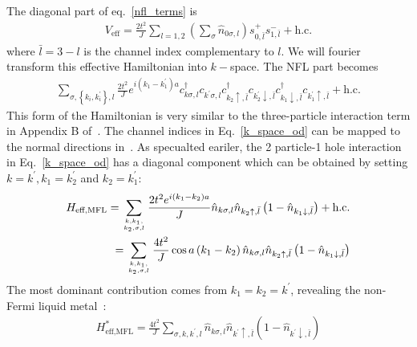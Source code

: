 \documentclass[reprint,prb,superscriptaddress]{revtex4-2}
\begin{document}
The diagonal part of eq.~\ref{nfl_terms} is
\begin{equation}\begin{aligned}
	V_\text{eff} = \frac{2t^2}{J}\sum_{l=1,2}\left(\sum_\sigma \hat n_{0\sigma,l}\right) s^+_{0,\bar l}s^-_{1,\bar l} + \text{h.c.}
\end{aligned}\end{equation}
where \(\bar l = 3 - l\) is the channel index complementary to \(l\). We will fourier transform this effective Hamiltonian into \(k-\)space. The NFL part becomes
\begin{equation}\begin{aligned}
	\label{k_space_od}
	\sum_{\sigma, \left\{k_i,k_i^\prime\right\},l} \frac{2t^2}{J}e^{i\left(k_1 - k_1^\prime\right)a}c^\dagger_{k\sigma,l}c_{k^\prime\sigma,l}c^\dagger_{k_2 \uparrow, \bar l}c_{k_2^\prime \downarrow,\bar l}c^\dagger_{k_1 \downarrow,\bar l}c_{k_1^\prime \uparrow, \bar l} + \text{h.c.} 
\end{aligned}\end{equation}
This form of the Hamiltonian is very similar to the three-particle interaction term in Appendix B of~\cite{anirbanmott1}. The channel indices in Eq.~\ref{k_space_od} can be mapped to the normal directions in~\cite{anirbanmott1}. As specualted eariler, the 2 particle-1 hole interaction in Eq.~\ref{k_space_od} has a diagonal component which can be obtained by setting \(k=k^\prime, k_1 = k_2^\prime\) and \(k_2 = k_1^\prime\):
\begin{equation}\begin{aligned}
	H_\text{eff,MFL} = \sum_{k, k_1, \atop{k_2,\sigma,  l}} \frac{2t^2e^{i\left(k_1 - k_2\right)a}}{J} \hat n_{k\sigma,l} \hat n_{k_2 \uparrow, \bar l}\left(1 - \hat n_{k_1 \downarrow,\bar l}\right) + \text{h.c.}\\
	= \sum_{k, k_1, \atop{k_2,\sigma,  l}} \frac{4t^2}{J} \cos a\left(k_1 - k_2\right)  \hat n_{k\sigma,l} \hat n_{k_2 \uparrow, \bar l}\left(1 - \hat n_{k_1 \downarrow,\bar l}\right)
\end{aligned}\end{equation}
The most dominant contribution comes from \(k_1 = k_2 = k^\prime\), revealing the non-Fermi liquid metal~\cite{cox_jarrell_two_channel_rev,andrei_jerez_1995}:
\begin{equation}\begin{aligned}
	\label{mfl_large}
	H^*_\text{eff,MFL} = \frac{4t^2}{J} \sum_{\sigma, k, k^\prime, l} \hat n_{k\sigma,l} \hat n_{k^\prime \uparrow, \bar l}\left(1 - \hat n_{k^\prime \downarrow,\bar l}\right)
\end{aligned}\end{equation}
\end{document}
